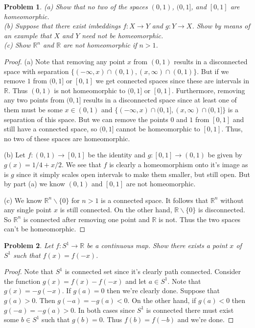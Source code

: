 \documentclass{article}
\newtheorem{problem}{Problem}
\begin{document}
\begin{problem}
(a) Show that no two of the spaces $(0,1)$, $(0,1]$, and $[0,1]$ are homeomorphic.\\
(b) Suppose that there exist imbeddings $f : X \to Y$ and $g : Y \to X$. Show by means of an example that $X$ and $Y$ need not be homeomorphic.\\
(c) Show $\mathbb{R}^n$ and $\mathbb{R}$ are not homeomorphic if $n > 1$.
\end{problem}
\begin{proof}
(a) Note that removing any point $x$ from $(0,1)$ results in a disconnected space with separation $\{(-\infty, x) \cap (0,1), (x, \infty) \cap (0,1)\}$. But if we remove $1$ from $(0,1]$ or $[0,1]$ we get connected spaces since these are intervals in $\mathbb{R}$. Thus $(0,1)$ is not homeomorphic to $(0,1]$ or $[0,1]$. Furthermore, removing any two points from $(0,1]$ results in a disconnected space since at least one of them must be some $x \in (0,1)$ and $\{(-\infty, x) \cap (0,1], (x, \infty) \cap (0,1]\}$ is a separation of this space. But we can remove the points $0$ and $1$ from $[0,1]$ and still have a connected space, so $(0,1]$ cannot be homeomorphic to $[0,1]$. Thus, no two of these spaces are homeomorphic.

(b) Let $f : (0,1) \to [0,1]$ be the identity and $g : [0,1] \to (0,1)$ be given by $g(x) = 1/4 + x/2$. We see that $f$ is clearly a homeomorphism onto it's image as is $g$ since it simply scales open intervals to make them smaller, but still open. But by part (a) we know $(0,1)$ and $[0,1]$ are not homeomorphic.

(c) We know $\mathbb{R}^n \backslash \{0\}$ for $n > 1$ is a connected space. It follows that $\mathbb{R}^n$ without any single point $x$ is still connected. On the other hand, $\mathbb{R} \backslash \{0\}$ is disconnected. So $\mathbb{R}^n$ is connected after removing one point and $\mathbb{R}$ is not. Thus the two spaces can't be homeomorphic.
\end{proof}

\begin{problem}
Let $f : S^1 \to \mathbb{R}$ be a continuous map. Show there exists a point $x$ of $S^1$ such that $f(x) = f(-x)$.
\end{problem}
\begin{proof}
Note that $S^1$ is connected set since it's clearly path connected. Consider the function $g(x) = f(x) - f(-x)$ and let $a \in S^1$. Note that $g(x) = -g(-x)$. If $g(a) = 0$ then we're clearly done. Suppose that $g(a) > 0$. Then $g(-a) = -g(a) < 0$. On the other hand, if $g(a) < 0$ then $g(-a) = -g(a) > 0$. In both cases since $S^1$ is connected there must exist some $b \in S^1$ such that $g(b) = 0$. Thus $f(b) = f(-b)$ and we're done.
\end{proof}
\end{document}
